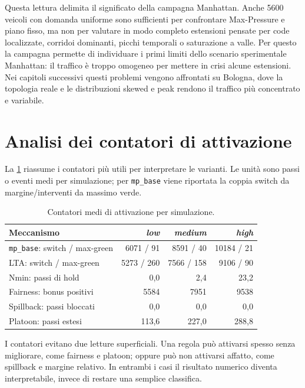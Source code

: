 \documentclass[12pt,a4paper,oneside]{report}
\numberwithin{equation}{chapter}
\begin{document}
Questa lettura delimita il significato della campagna Manhattan. Anche 5600
veicoli con domanda uniforme sono sufficienti per confrontare Max-Pressure e
piano fisso, ma non per valutare in modo completo estensioni pensate per code
localizzate, corridoi dominanti, picchi temporali o saturazione a valle. Per
questo la campagna permette di individuare i primi limiti dello scenario
sperimentale Manhattan: il traffico è troppo omogeneo per mettere in crisi alcune
estensioni. Nei capitoli successivi questi problemi vengono affrontati su
Bologna, dove la topologia reale e le distribuzioni skewed e peak rendono il
traffico più concentrato e variabile.

\section{Analisi dei contatori di attivazione}

La \cref{tab:activation-manhattan} riassume i contatori più utili per
interpretare le varianti. Le unità sono passi o eventi medi per simulazione;
per \texttt{mp\_base} viene riportata la coppia switch da margine/interventi da
massimo verde.

\begin{table}[htbp]
    \centering
    \caption{Contatori medi di attivazione per simulazione.}
    \label{tab:activation-manhattan}
    \begin{tabular}{lrrr}
        \toprule
        Meccanismo & \emph{low} & \emph{medium} & \emph{high} \\
        \midrule
        \texttt{mp\_base}: switch / max-green & 6071 / 91 & 8591 / 40 & 10184 / 21 \\
        LTA: switch / max-green & 5273 / 260 & 7566 / 158 & 9106 / 90 \\
        Nmin: passi di hold & 0,0 & 2,4 & 23,2 \\
        Fairness: bonus positivi & 5584 & 7951 & 9538 \\
        Spillback: passi bloccati & 0,0 & 0,0 & 0,0 \\
        Platoon: passi estesi & 113,6 & 227,0 & 288,8 \\
        \bottomrule
    \end{tabular}
\end{table}

I contatori evitano due letture superficiali. Una regola può attivarsi spesso
senza migliorare, come fairness e platoon; oppure può non attivarsi affatto,
come spillback e margine relativo. In entrambi i casi il risultato numerico
diventa interpretabile, invece di restare una semplice classifica.
\end{document}

